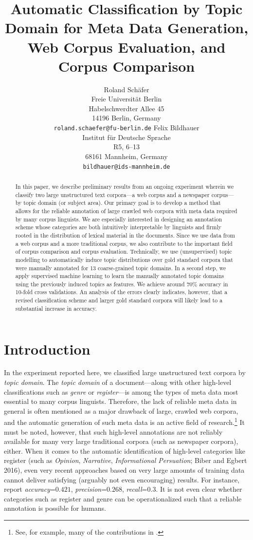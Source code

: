 \documentclass[11pt]{article}
\title{Automatic Classification by Topic Domain for Meta Data Generation, Web Corpus Evaluation, and Corpus Comparison}
\author{Roland Schäfer\\
	    Freie Universität Berlin\\
	    Habelschwerdter Allee 45\\
	    14196 Berlin, Germany\\
	    {\tt roland.schaefer@fu-berlin.de}
	  \And
	Felix Bildhauer\\
  	Institut für Deutsche Sprache\\
  	R5, 6--13\\
  	68161 Mannheim, Germany\\
  {\tt bildhauer@ids-mannheim.de}}
\date{}
\begin{document}
\maketitle

\begin{abstract}
In this paper, we describe preliminary results from an ongoing experiment wherein we classify two large unstructured text corpora---a web corpus and a
newspaper corpus---by topic domain (or subject area).
Our primary goal is to develop a method that allows for the reliable annotation of large crawled web corpora with meta data required by many corpus linguists. We are especially interested in designing an annotation scheme whose categories are both intuitively interpretable by linguists and firmly rooted in the distribution of lexical material in the documents.
Since we use data from a web corpus and a more traditional corpus, we also contribute to the important field of corpus comparison and corpus evaluation.
Technically, we use (unsupervised) topic modelling to automatically induce topic distributions over gold standard corpora that were manually annotated for 13 coarse-grained topic domains.
In a second step, we apply supervised machine learning to learn the manually annotated topic domains using the previously induced topics as features.
We achieve around 70\% accuracy in 10-fold cross validations.
An analysis of the errors clearly indicates, however, that a revised classification scheme and larger gold standard corpora will likely lead to a substantial increase in accuracy.
\end{abstract}

\section{Introduction}
\label{sec:introduction}

In the experiment reported here, we classified large unstructured text corpora by \textit{topic domain}.
The \textit{topic domain} of a document---along with other high-level classifications such as \textit{genre} or \textit{register}---is among the types of meta data most essential to many corpus linguists.
Therefore, the lack of reliable meta data in general is often mentioned as a major drawback of large, crawled web corpora, and the automatic generation of such meta data is an active field of research.\footnote{See, for example, many of the contributions in .}
It must be noted, however, that such high-level annotations are not reliably available for many very large traditional corpora (such as newspaper corpora), either.
When it comes to the automatic identification of high-level categories like register (such as \textit{Opinion}, \textit{Narrative}, \textit{Informational Persuation}; Biber and Egbert 2016), even very recent approaches based on very large amounts of training data cannot deliver satisfying (arguably not even encouraging) results.
For instance,  report \textit{accuracy}=$0.421$, \textit{precision}=$0.268$, \textit{recall}=$0.3$.
It is not even clear whether categories such as register and genre can be operationalized such that a reliable annotation is possible for humans.
\end{document}
